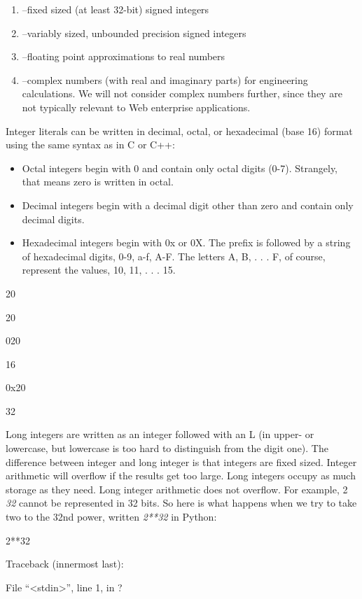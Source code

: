 \begin{enumerate}
\tightlist
\item
   --fixed sized (at
  least 32-bit) signed integers
\item
   --variably
  sized, unbounded precision signed integers
\item
   --floating point
  approximations to real numbers
\item
   --complex numbers
  (with real and imaginary parts) for engineering calculations. We will
  not consider complex numbers further, since they are not typically
  relevant to Web enterprise applications.
\end{enumerate}

Integer literals can be written in
decimal, octal, or hexadecimal (base 16) format using the same syntax as
in C or C++:

\begin{itemize}
\tightlist
\item
  Octal integers begin with 0 and
  contain only octal digits (0-7). Strangely, that means zero is written
  in octal.
\item
  Decimal integers begin with a
  decimal digit other than zero and contain only decimal digits.
\item
  Hexadecimal integers begin with
  0x or 0X. The prefix is followed by a string of hexadecimal digits,
  0-9, a-f, A-F. The letters A, B, . . . F, of course, represent the
  values, 10, 11, . . . 15.
\end{itemize}


20

20


020

16


0x20

32

Long integers are written as an
integer followed with an L (in upper- or lowercase, but lowercase is too
hard to distinguish from the digit one). The difference between integer
and long integer is that integers are fixed sized. Integer arithmetic
will overflow if the results get too large. Long integers occupy as much
storage as they need. Long integer arithmetic does not overflow. For
example, 2 \emph{32} cannot be represented in 32 bits. So here is what
happens when we try to take two to the 32nd power, written \emph{2**32}
in Python:


2**32

Traceback (innermost last):

 File
``\textless{}stdin\textgreater{}'', line 1, in ?

